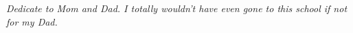 \clearpage
\vspace*{\fill}
	\begin{center}
		\begin{minipage}{\textwidth}
		\emph{
				Dedicate to Mom and Dad. I totally wouldn't have even gone to this school if not for my Dad.
			}
		\end{minipage}
	\end{center}
\vfill %
\clearpage